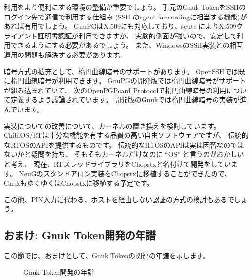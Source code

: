 \documentclass[mingoth,a4paper,twoside]{jsarticle}
\begin{document}
利用をより便利にする環境の整備が重要でしょう。
手元のGnuk TokenをSSHのログイン先で通信で利用する仕組み
(SSH のagent forwardingに相当する機能)があれば有用でしょう。
GnuPGはX.509にも対応しており、scute\cite{scute}
によりX.509クライアント証明書認証が利用できますが、
実験的側面が強いので、安定して利用できるようにする必要があるでしょう。
また、WindowsのSSH実装との相互運用の問題も解決する必要があります。

暗号方式の拡充として、楕円曲線暗号のサポートがあります。
OpenSSHでは既に楕円曲線暗号が利用できます。
GnuPGの開発版では楕円曲線暗号がサポートが組み込まれていて、
次のOpenPGPcard Protocolで楕円曲線暗号の利用について定義するよう議論されています。
開発版のGnukでは楕円曲線暗号の実装が進んでいます。

実装についての改善について、カーネルの置き換えを検討しています。
ChibiOS/RTは十分な機能を有する品質の高い自由ソフトウェアですが、
伝統的なRTOSのAPIを提供するものです。
伝統的なRTOSのAPIは実は因習なのではないかと疑問を持ち、
そもそもカーネルだけなのに ``OS'' と言うのがおかしいと考え、
現在、RTスレッドライブラリをChopstx\cite{chopstx}と名付けて開発をしています。
NeuGのスタンドアロン実装をChopstxに移植することができたので、
GnukもゆくゆくはChopstxに移植する予定です。

この他、PIN入力に代わる、ホストを経由しない認証の方式の検討もあるでしょう。
\fi

\iffalse
\subsection{おまけ: Gnuk Token開発の年譜}
この節では、おまけとして、Gnuk Tokenの関連の年譜を示します。

\begin{figure}[h]
\centering
{}
\caption{Gnuk Token開発の年譜}
\end{figure}
\end{document}
